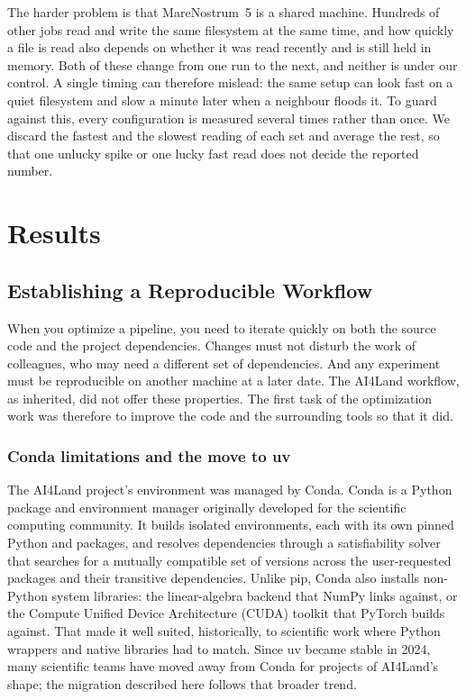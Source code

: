 \documentclass[12pt,a4paper]{article}
\begin{document}
The harder problem is that MareNostrum~5 is a shared machine. Hundreds of other jobs read and
write the same filesystem at the same time, and how quickly a file is read also depends on
whether it was read recently and is still held in memory. Both of these change from one run to
the next, and neither is under our control. A single timing can therefore mislead: the same
setup can look fast on a quiet filesystem and slow a minute later when a neighbour floods it. To
guard against this, every configuration is measured several times rather than once. We discard
the fastest and the slowest reading of each set and average the rest, so that one unlucky spike
or one lucky fast read does not decide the reported number.

\section{Results}\label{sec:results}

\subsection{Establishing a Reproducible Workflow}

When you optimize a pipeline, you need to iterate quickly on both the source code and the
project dependencies. Changes must not disturb the work of colleagues, who may need a different
set of dependencies. And any experiment must be reproducible on another machine at a later date.
The AI4Land workflow, as inherited, did not offer these properties. The first task of the
optimization work was therefore to improve the code and the surrounding tools so that it did.

\subsubsection{Conda limitations and the move to uv}

The AI4Land project's environment was managed by Conda. Conda is a Python package and environment
manager originally developed for the scientific computing community. It builds isolated
environments, each with its own pinned Python and packages, and resolves dependencies through a
satisfiability solver that searches for a mutually compatible set of versions across the
user-requested packages and their transitive dependencies. Unlike pip, Conda also installs
non-Python system libraries: the linear-algebra backend that NumPy links against, or the Compute
Unified Device Architecture (CUDA) toolkit that PyTorch builds against. That made it well suited,
historically, to scientific work where Python wrappers and native libraries had to match. Since
uv became stable in 2024, many scientific teams have moved away from Conda for projects of
AI4Land's shape; the migration described here follows that broader trend.
\end{document}
